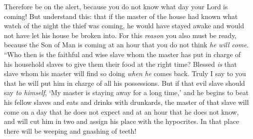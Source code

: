 \begin{biblechapter}
\verse Therefore be on the alert, because you do not know what day your Lord is coming!
\verse But understand this: that if the master of the house had known what watch of the night the thief was coming, he would have stayed awake and would not have let his house be broken into.
\verse For this \textit{reason} you also must be ready, because the Son of Man is coming at an hour that you do not think \textit{he will come}.
 “Who then is the faithful and wise slave whom the master has put in charge of his household slaves to give them their food at the right time?
\verse Blessed \textit{is} that slave whom his master will find so doing \textit{when he} comes back.
\verse Truly I say to you that he will put him in charge of all his possessions.
\verse But if that evil slave should say \textit{to himself}, ‘My master is staying away for a long time,’
\verse and he begins to beat his fellow slaves and eats and drinks with drunkards,
\verse the master of that slave will come on a day that he does not expect and at an hour that he does not know,
\verse and will cut him in two and assign his place with the hypocrites. In that place there will be weeping and gnashing of teeth!
\end{biblechapter}

